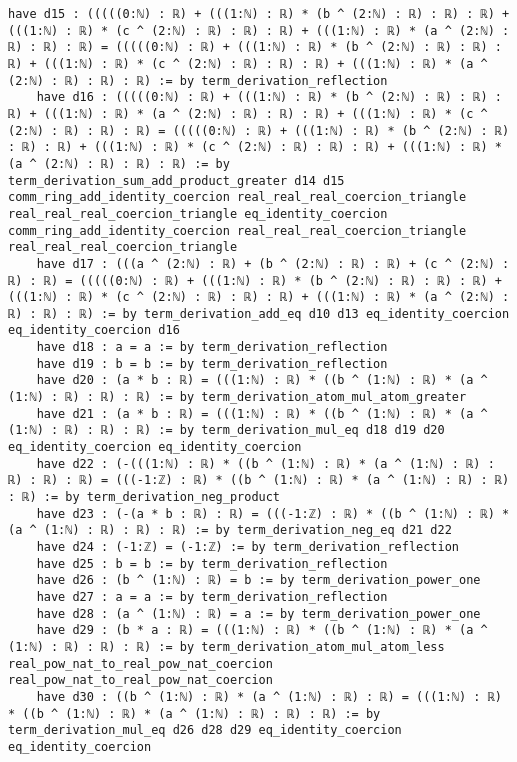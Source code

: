 \documentclass{article}
\begin{document}
\begin{tcolorbox}[colback=white!10, width=\linewidth]
\begin{lstlisting}[language=Lean4]
    have d15 : (((((0:ℕ) : ℝ) + (((1:ℕ) : ℝ) * (b ^ (2:ℕ) : ℝ) : ℝ) : ℝ) + (((1:ℕ) : ℝ) * (c ^ (2:ℕ) : ℝ) : ℝ) : ℝ) + (((1:ℕ) : ℝ) * (a ^ (2:ℕ) : ℝ) : ℝ) : ℝ) = (((((0:ℕ) : ℝ) + (((1:ℕ) : ℝ) * (b ^ (2:ℕ) : ℝ) : ℝ) : ℝ) + (((1:ℕ) : ℝ) * (c ^ (2:ℕ) : ℝ) : ℝ) : ℝ) + (((1:ℕ) : ℝ) * (a ^ (2:ℕ) : ℝ) : ℝ) : ℝ) := by term_derivation_reflection
    have d16 : (((((0:ℕ) : ℝ) + (((1:ℕ) : ℝ) * (b ^ (2:ℕ) : ℝ) : ℝ) : ℝ) + (((1:ℕ) : ℝ) * (a ^ (2:ℕ) : ℝ) : ℝ) : ℝ) + (((1:ℕ) : ℝ) * (c ^ (2:ℕ) : ℝ) : ℝ) : ℝ) = (((((0:ℕ) : ℝ) + (((1:ℕ) : ℝ) * (b ^ (2:ℕ) : ℝ) : ℝ) : ℝ) + (((1:ℕ) : ℝ) * (c ^ (2:ℕ) : ℝ) : ℝ) : ℝ) + (((1:ℕ) : ℝ) * (a ^ (2:ℕ) : ℝ) : ℝ) : ℝ) := by term_derivation_sum_add_product_greater d14 d15 comm_ring_add_identity_coercion real_real_real_coercion_triangle real_real_real_coercion_triangle eq_identity_coercion comm_ring_add_identity_coercion real_real_real_coercion_triangle real_real_real_coercion_triangle
    have d17 : (((a ^ (2:ℕ) : ℝ) + (b ^ (2:ℕ) : ℝ) : ℝ) + (c ^ (2:ℕ) : ℝ) : ℝ) = (((((0:ℕ) : ℝ) + (((1:ℕ) : ℝ) * (b ^ (2:ℕ) : ℝ) : ℝ) : ℝ) + (((1:ℕ) : ℝ) * (c ^ (2:ℕ) : ℝ) : ℝ) : ℝ) + (((1:ℕ) : ℝ) * (a ^ (2:ℕ) : ℝ) : ℝ) : ℝ) := by term_derivation_add_eq d10 d13 eq_identity_coercion eq_identity_coercion d16
    have d18 : a = a := by term_derivation_reflection
    have d19 : b = b := by term_derivation_reflection
    have d20 : (a * b : ℝ) = (((1:ℕ) : ℝ) * ((b ^ (1:ℕ) : ℝ) * (a ^ (1:ℕ) : ℝ) : ℝ) : ℝ) := by term_derivation_atom_mul_atom_greater
    have d21 : (a * b : ℝ) = (((1:ℕ) : ℝ) * ((b ^ (1:ℕ) : ℝ) * (a ^ (1:ℕ) : ℝ) : ℝ) : ℝ) := by term_derivation_mul_eq d18 d19 d20 eq_identity_coercion eq_identity_coercion
    have d22 : (-(((1:ℕ) : ℝ) * ((b ^ (1:ℕ) : ℝ) * (a ^ (1:ℕ) : ℝ) : ℝ) : ℝ) : ℝ) = (((-1:ℤ) : ℝ) * ((b ^ (1:ℕ) : ℝ) * (a ^ (1:ℕ) : ℝ) : ℝ) : ℝ) := by term_derivation_neg_product
    have d23 : (-(a * b : ℝ) : ℝ) = (((-1:ℤ) : ℝ) * ((b ^ (1:ℕ) : ℝ) * (a ^ (1:ℕ) : ℝ) : ℝ) : ℝ) := by term_derivation_neg_eq d21 d22
    have d24 : (-1:ℤ) = (-1:ℤ) := by term_derivation_reflection
    have d25 : b = b := by term_derivation_reflection
    have d26 : (b ^ (1:ℕ) : ℝ) = b := by term_derivation_power_one
    have d27 : a = a := by term_derivation_reflection
    have d28 : (a ^ (1:ℕ) : ℝ) = a := by term_derivation_power_one
    have d29 : (b * a : ℝ) = (((1:ℕ) : ℝ) * ((b ^ (1:ℕ) : ℝ) * (a ^ (1:ℕ) : ℝ) : ℝ) : ℝ) := by term_derivation_atom_mul_atom_less real_pow_nat_to_real_pow_nat_coercion real_pow_nat_to_real_pow_nat_coercion
    have d30 : ((b ^ (1:ℕ) : ℝ) * (a ^ (1:ℕ) : ℝ) : ℝ) = (((1:ℕ) : ℝ) * ((b ^ (1:ℕ) : ℝ) * (a ^ (1:ℕ) : ℝ) : ℝ) : ℝ) := by term_derivation_mul_eq d26 d28 d29 eq_identity_coercion eq_identity_coercion

\end{lstlisting}
\end{tcolorbox}
\end{document}
